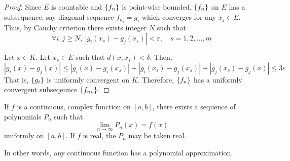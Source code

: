 \begin{proof}
	Since $E$ is countable and $\left\{f_n\right\}$ is point-wise bounded, $\left\{f_n\right\}$ on $E$ has a subsequence, say diagonal sequence $f_{n_i} = g_i$ which converges for any $x_j \in E$.
	Thus, by Cauchy criterion there exists integer $N$ such that 
	\[ \forall i,j \ge N,\ |g_i(x_s) - g_j(x_s)| < \varepsilon,\quad s = 1,2,\dots,m \]

	Let $x \in K$.
	Let $x_s \in E$ such that $d(x,x_s) < \delta$.
	Then,
	\[ |g_i(x) - g_j(x)| \le |g_i(x)-g_i(x_s)| + |g_i(x_s) - g_j(x_s)| + |g_j(x_s) - g_j(x)| \le 3\varepsilon \]
	That is, $\left\{g_i\right\}$ is uniformly convergent on $K$.
	Therefore, $\left\{f_n\right\}$ has a uniformly convergent subseqeunce $\left\{f_{n_k}\right\}$.
\end{proof}

\begin{theorem}
	If $f$ is a continuous, complex function on $[a,b]$, there exists a sequence of polynomials $P_n$ such that
	\[ \lim_{n \to \infty} P_n(x) = f(x) \]
	uniformly on $[a,b]$.
	If $f$ is real, the $P_n$ may be taken real.
\end{theorem}
\begin{important}
In other words, any continuous function has a polynomial approximation.
\end{important}
